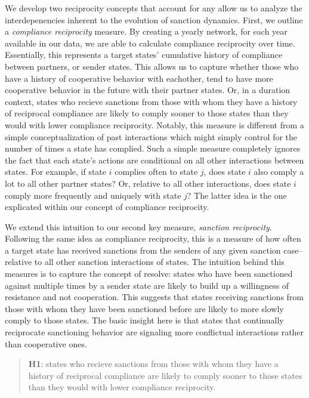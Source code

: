 We develop two reciprocity concepts that account for any allow us to analyze the interdepenencies inherent to the evolution of sanction dynamics. First, we outline a \textit{compliance reciprocity} measure. By creating a yearly network, for each year available in our data, we are able to calculate compliance reciprocity over time. Essentially, this represents a target states' cumulative history of compliance between partners, or sender states. This allows us to capture whether those who have a history of cooperative behavior with eachother, tend to have more cooperative behavior in the future with their partner states. Or, in a duration context, states who recieve sanctions from those with whom they have a history of reciprocal compliance are likely to comply sooner to those states than they would with lower compliance reciprocity. Notably, this measure is different from a simple conceptualization of past interactions which might simply control for the number of times a state has complied. Such a simple measure completely ignores the fact that each state's actions are conditional on all other interactions between states. For example, if state $i$ complies often to state $j$, does state $i$ also comply a lot to all other partner states? Or, relative to all other interactions, does state $i$ comply more frequently and uniquely with state $j$? The latter idea is the one explicated within our  concept of compliance reciprocity. 

We extend this intuition to our second key measure, \textit{sanction reciprocity}. Following the same idea as compliance reciprocity, this is a measure of how often a target state has received sanctions from the senders of any given sanction case--relative to all other sanction interactions of states. The intuition behind this measures is to capture the concept of resolve: states who have been sanctioned against multiple times by a sender state are likely to build up a willingness of resistance and not cooperation.  This suggests that states receiving sanctions from those with whom they have been sanctioned before are likely to more slowly comply to those states. The basic insight here is that states that continually reciprocate sanctioning behavior are signaling more conflictual interactions rather than cooperative ones. 

\begin{quote}
	\textbf{H1}: states who recieve sanctions from those with whom they have a history of reciprocal compliance are likely to comply sooner to those states than they would with lower compliance reciprocity. 
\end{quote}


